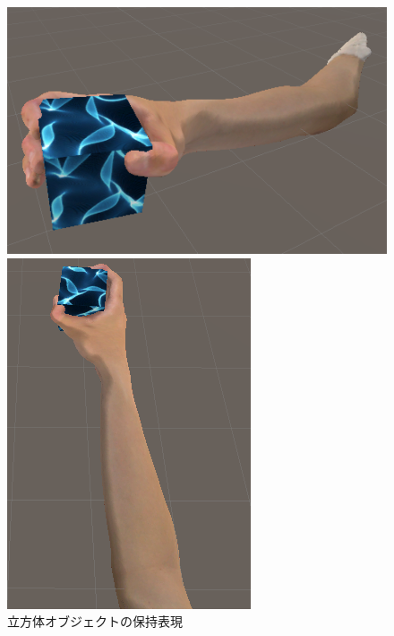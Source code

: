 \documentclass{ltjsreport}
\begin{document}
		\begin{figure}[H]
		\centering
		\begin{minipage}{0.4\columnwidth}
		\centering
		\includegraphics[width = \columnwidth]{../figs/grapcube_side.png}
		\end{minipage}
		\hspace{0.04\columnwidth}
		\begin{minipage}{0.2\columnwidth}
		\centering
		\includegraphics[width = \columnwidth]{../figs/grapcube_up.png}
		\end{minipage}
		\caption{立方体オブジェクトの保持表現}
		\label{fig:cubehold}
		\end{figure}
		
\end{document}
